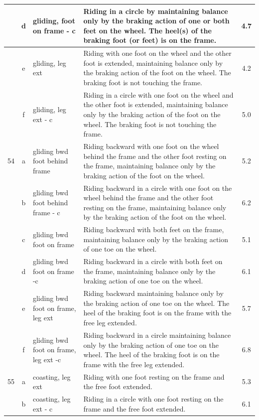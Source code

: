 \begin{longtable}{|r|c|p{4cm}|p{8cm}|c|}
\hline
  & d & gliding, foot on frame - c  & Riding in a circle by maintaining balance only by the braking action of one or both feet on the wheel. The heel(s) of the braking foot (or feet) is on the frame. & 4.7 \\ 
\hline
  & e & gliding, leg ext  & Riding with one foot on the wheel and the other foot is extended, maintaining balance only by the braking action of the foot on the wheel. The braking foot is not touching the frame.  & 4.2 \\ 
\hline
  & f & gliding, leg ext - c  & Riding in a circle with one foot on the wheel and the other foot is extended, maintaining balance only by the braking action of the foot on the wheel. The braking foot is not touching the frame.  & 5.0 \\ 
\hline
54  & a & gliding bwd foot behind frame & Riding backward with one foot on the wheel behind the frame and the other foot resting on the frame, maintaining balance only by the braking action of the foot on the wheel. & 5.2 \\ 
\hline
  & b & gliding bwd foot behind frame - c & Riding backward in a circle with one foot on the wheel behind the frame and the other foot resting on the frame, maintaining balance only by the braking action of the foot on the wheel. & 6.2 \\ 
\hline
  & c & gliding bwd foot on frame & Riding backward with both feet on the frame, maintaining balance only by the braking action of one toe on the wheel.  & 5.1 \\ 
\hline
  & d & gliding bwd foot on frame -c  & Riding backward in a circle with both feet on the frame, maintaining balance only by the braking action of one toe on the wheel.  & 6.1 \\ 
\hline
  & e & gliding bwd foot on frame, leg ext  & Riding backward maintaining balance only by the braking action of one toe on the wheel. The heel of the braking foot is on the frame with the free leg extended.  & 5.7 \\ 
\hline
  & f & gliding bwd foot on frame, leg ext -c & Riding backward in a circle maintaining balance only by the braking action of one toe on the wheel. The heel of the braking foot is on the frame with the free leg extended.  & 6.8 \\ 
\hline
55  & a & coasting, leg ext & Riding with one foot resting on the frame and the free foot extended. & 5.3 \\ 
\hline
  & b & coasting, leg ext - c & Riding in a circle with one foot resting on the frame and the free foot extended. & 6.1 \\ 

\end{longtable}
